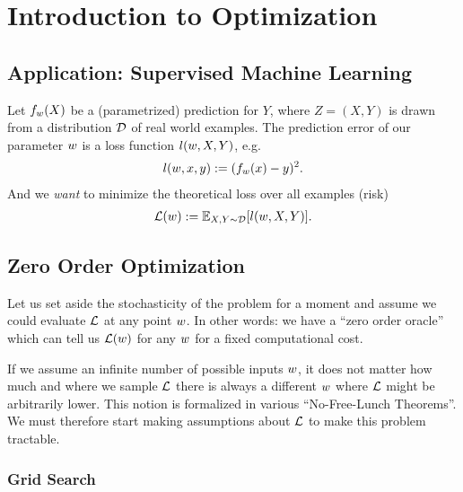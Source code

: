 
\chapter{Introduction to Optimization}

\section{Application: Supervised Machine Learning}

Let \(f_{w}(X)\) be a (parametrized) prediction for \(Y\), where \(Z=(X,Y)\)
is drawn from a distribution \(\mathcal{D}\) of real world examples. The prediction
error of our parameter \(w\) is a loss function \(l(w, X, Y)\), e.g. 
%
\begin{align*}
	l(w, x, y) := (f_{w}(x) - y)^2.
\end{align*}
%
And we \emph{want} to minimize the theoretical loss over all examples (risk)
%
\begin{align*}
	\mathcal{L}(w) := \mathbb{E}_{X,Y\sim \mathcal{D}} [l(w, X, Y)].
\end{align*}

\section{Zero Order Optimization}

Let us set aside the stochasticity of the problem for a moment and assume we
could evaluate \(\mathcal{L}\) at any point \(w\). In other words: we have a ``zero
order oracle'' which can tell us \(\mathcal{L}(w)\) for any \(w\) for a fixed
computational cost.

If we assume an infinite number of possible inputs \(w\), it does not matter
how much and where we sample \(\mathcal{L}\) there is always a different \(w\) where
\(\mathcal{L}\) might be arbitrarily lower. This notion is formalized in various ``No-Free-Lunch
Theorems''. We must therefore start making assumptions about \(\mathcal{L}\) to make this
problem tractable.

\subsection{Grid Search}



